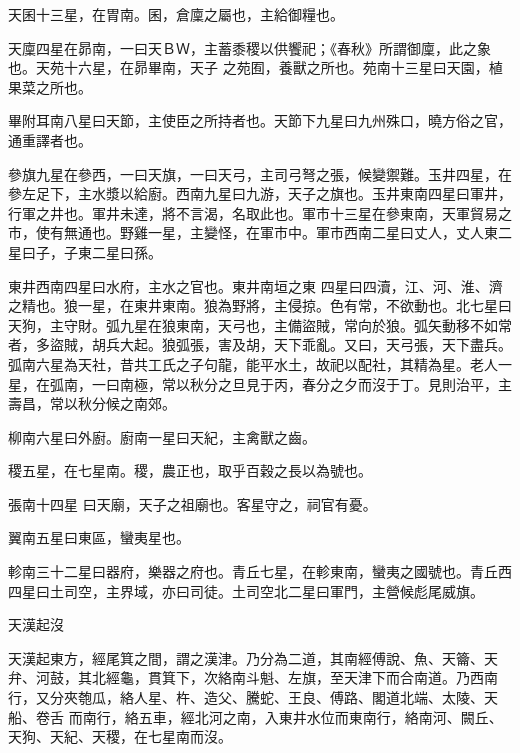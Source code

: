 \begin{pinyinscope}
{{ 天囷十三星，在胃南。囷，倉廩之屬也，主給御糧也。



 天廩四星在昴南，一曰天ＢＷ，主蓄黍稷以供饗祀；《春秋》所謂御廩，此之象也。天苑十六星，在昴畢南，天子
 之苑囿，養獸之所也。苑南十三星曰天園，植果菜之所也。



 畢附耳南八星曰天節，主使臣之所持者也。天節下九星曰九州殊口，曉方俗之官，通重譯者也。



 參旗九星在參西，一曰天旗，一曰天弓，主司弓弩之張，候變禦難。玉井四星，在參左足下，主水漿以給廚。西南九星曰九游，天子之旗也。玉井東南四星曰軍井，行軍之井也。軍井未達，將不言渴，名取此也。軍市十三星在參東南，天軍貿易之市，使有無通也。野雞一星，主變怪，在軍市中。軍市西南二星曰丈人，丈人東二星曰子，子東二星曰孫。



 東井西南四星曰水府，主水之官也。東井南垣之東
 四星曰四瀆，江、河、淮、濟之精也。狼一星，在東井東南。狼為野將，主侵掠。色有常，不欲動也。北七星曰天狗，主守財。弧九星在狼東南，天弓也，主備盜賊，常向於狼。弧矢動移不如常者，多盜賊，胡兵大起。狼弧張，害及胡，天下乖亂。又曰，天弓張，天下盡兵。弧南六星為天社，昔共工氏之子句龍，能平水土，故祀以配社，其精為星。老人一星，在弧南，一曰南極，常以秋分之旦見于丙，春分之夕而沒于丁。見則治平，主壽昌，常以秋分候之南郊。



 柳南六星曰外廚。廚南一星曰天紀，主禽獸之齒。



 稷五星，在七星南。稷，農正也，取乎百穀之長以為號也。



 張南十四星
 曰天廟，天子之祖廟也。客星守之，祠官有憂。



 翼南五星曰東區，蠻夷星也。



 軫南三十二星曰器府，樂器之府也。青丘七星，在軫東南，蠻夷之國號也。青丘西四星曰土司空，主界域，亦曰司徒。土司空北二星曰軍門，主營候彪尾威旗。



 天漢起沒



 天漢起東方，經尾箕之間，謂之漢津。乃分為二道，其南經傅說、魚、天籥、天弁、河鼓，其北經龜，貫箕下，次絡南斗魁、左旗，至天津下而合南道。乃西南行，又分夾匏瓜，絡人星、杵、造父、騰蛇、王良、傅路、閣道北端、太陵、天船、卷舌
 而南行，絡五車，經北河之南，入東井水位而東南行，絡南河、闕丘、天狗、天紀、天稷，在七星南而沒。



}}
\end{pinyinscope}
